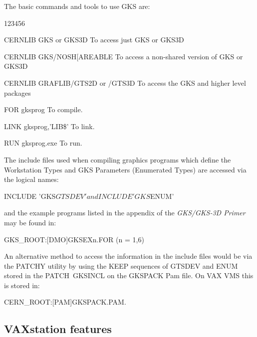 The basic commands and tools to use GKS are:
\begin{DLtt}{123456}
\item[CERNLIB GKS or GKS3D]
To access just GKS or GKS3D
\item[CERNLIB GKS/NOSH[AREABLE]
To access a non-shared version of GKS or GKS3D
\item[CERNLIB GRAFLIB/GTS2D or /GTS3D]
To access the GKS and higher level packages
\item[FOR gksprog]To compile.
\item[LINK gksprog,'LIB\$']To link.
\item[RUN gksprog.exe]To run.
\end{DLtt}
 
The include files used when compiling graphics programs which
define the Workstation Types and GKS Parameters (Enumerated Types)
are accessed via the logical names:
\begin{XMP}
      INCLUDE 'GKS$GTSDEV'
          and
      INCLUDE 'GKS$ENUM'
\end{XMP}
and the example programs listed in the appendix of the
{\it GKS/GKS-3D Primer} may be found in:
\begin{XMP}
GKS_ROOT:[DMO]GKSEXn.FOR (n = 1,6)
\end{XMP}
 
An alternative method to access the information in the include files
would be via the PATCHY utility by using the KEEP sequences of
GTSDEV and ENUM stored in the PATCH~GKSINCL on the GKSPACK Pam file.
On VAX VMS this is stored in:
\begin{XMP}
CERN_ROOT:[PAM]GKSPACK.PAM.
\end{XMP}
\subsection{\protect\label{sec:vstnref}VAXstation features}
 
